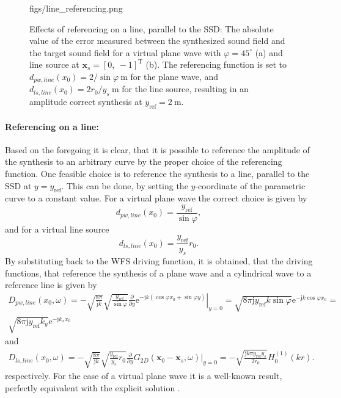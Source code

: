 \documentclass[12pt,a4paper]{article}
\newcommand{\te}{\mathrm{e}}
\newcommand{\ti}{\mathrm{j}}
\newcommand{\sinfi}{\sin\varphi}
\newcommand{\cosfi}{\cos\varphi}
\newcommand{\yref}{y_{\mathrm{ref}}}
\newcommand{\vxo}{\mathbf{x}_0}
\begin{document}
\begin{figure}
	\centering
	\begin{overpic}[width = 1\columnwidth ]{figs/line_referencing.png}
	\scriptsize
	\end{overpic}
\caption{Effects of referencing on a line, parallel to the SSD: The absolute value of the error measured between the synthesized sound field and the target sound field for a virtual plane wave with $\varphi = 45^{\circ}$ (a) and line source at $\mathbf{x}_s = [0,\ -1]^{\mathrm{T}}$ (b). The referencing function is set to $d_{pw,line}(x_0) = 2 / \sinfi ~\mathrm{m}$ for the plane wave, and $d_{ls,line}(x_0) = 2 r_0/y_s ~\mathrm{m}$ for the line source, resulting in an amplitude correct synthesis at $\yref = 2~\mathrm{m}$.}
	\label{Fig:Theory:line_referencing}
\end{figure}

\paragraph{Referencing on a line:\\}
Based on the foregoing it is clear, that it is possible to reference the amplitude of the synthesis to an arbitrary curve by the proper choice of the referencing function. 
One feasible choice is to reference the synthesis to a line, parallel to the SSD at $y=\yref$. This can be done, by setting the $y$-coordinate of the parametric curve to a constant value.
For a virtual plane wave the correct choice is given by
\begin{equation}
d_{pw,line}(x_0) = \frac{\yref}{\sinfi},
\end{equation}
and for a virtual line source 
\begin{equation}
d_{ls,line}(x_0) = \frac{\yref}{y_s} r_0.
\end{equation}
By substituting back to the WFS driving function, it is obtained, that the driving functions, that reference the synthesis of a plane wave and a cylindrical wave to a reference line is given by
\begin{multline}
D_{pw,line}(x_0,\omega) = 
- \sqrt{\frac{8\pi}{\ti k}}\sqrt{\frac{\yref}{\sinfi}} \frac{\partial}{\partial y} \left. \te^{-\ti k (\cosfi x_0 + \sinfi y)} \right|_{y = 0} = 
\sqrt{8\pi \ti \yref k \sinfi}\te^{-\ti k \cosfi x_0 } =\\ 
\sqrt{8\pi \ti \yref k_y }\te^{-\ti k_x x_0 }
\end{multline}
and
\begin{multline}
D_{ls,line}(x_0,\omega) = 
- \sqrt{\frac{8\pi}{\ti k}}\sqrt{\frac{\yref}{y_s} r_0} \frac{\partial}{\partial y} \left. G_{2D}(\vxo -  \mathbf{x}_s,\omega) \right|_{y = 0} =
- \sqrt{\frac{\ti k \pi \yref y_s}{2 r_0}}  H_0^{(1)}( k r ).
\end{multline}
respectively. For the case of a virtual plane wave it is a well-known result, perfectly equivalent with the explicit solution \cite{Ahrens2012}.
\end{document}
